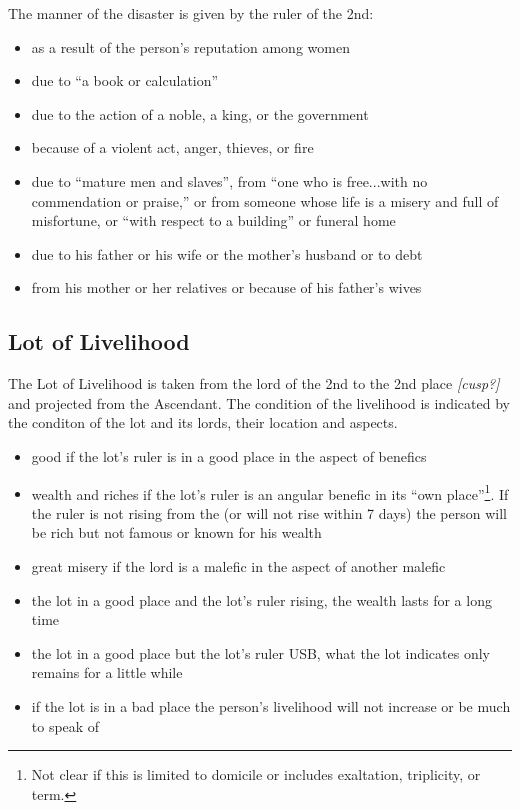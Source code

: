 The manner of the disaster is given by the ruler of the 2nd:
\begin{itemize}[topsep=0em,itemsep=0em]
\item[\Venus] as a result of the person's reputation among women

\item[\Mercury] due to ``a book or calculation''

\item[\Jupiter] due to the action of a noble, a king, or the government

\item[\Mars] because of a violent act, anger, thieves, or fire

\item[\Saturn] due to ``mature men and slaves'', from ``one who is free...with no commendation or praise,'' or from someone whose life is a misery and full of misfortune, or ``with respect to a building'' or funeral home

\item[\Sun] due to his father or his wife or the mother's husband or to debt

\item[\Moon] from his mother or her relatives or because of his father's wives
\end{itemize}

\subsection{Lot of Livelihood}
The Lot of Livelihood is taken from the lord of the 2nd to the 2nd place \textsl{[cusp?]} and projected from the Ascendant. The condition of the livelihood is indicated by the conditon of the lot and its lords, their location and aspects.

\begin{itemize}[topsep=0em,itemsep=0em]
\item good if the lot's ruler is in a good place in the aspect of benefics

\item wealth and riches if the lot's ruler is an angular benefic in its ``own place''\footnote{Not clear if this is limited to domicile or includes exaltation, triplicity, or term.}. If the ruler is not rising from the \Sun (or will not rise within 7 days) the person will be rich but not famous or known for his wealth

\item great misery if the lord is a malefic in the aspect of another malefic

\item the lot in a good place and the lot's ruler rising, the wealth lasts for a long time

\item the lot in a good place but the lot's ruler USB, what the lot indicates only remains for a little while

\item if the lot is in a bad place the person's livelihood will not increase or be much to speak of
\end{itemize}

